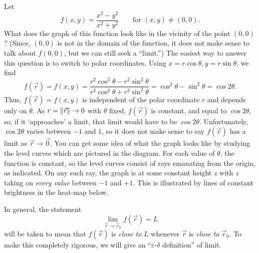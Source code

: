 \begin{example}
	\label{EXDISCONT}
	Let
	\[
	   f(x,y) = \frac{x^2 - y^2}{x^2 + y^2}\qquad\text{for } (x,y) \not= (0,0).
	\]
	 What does the graph of this function look like in the vicinity
	of the point $(0,0)$?   (Since, $(0,0)$ is not in the domain of
	the function, it does not make sense  to talk about
	$f(0,0)$, but we can still seek a ``limit.'')  The easiest way to
	answer this question is to switch to polar coordinates.   Using
	$x = r\cos\theta, y = r\sin\theta$, we find
	\[
	f(\vec r) = f(x,y) = \frac{r^2\cos^2\theta - r^2\sin^2\theta}
	{r^2\cos^2\theta + r^2\sin^2\theta} = \cos^2\theta - \sin^2\theta
	 = \cos 2\theta.
	\]
	Thus, $f(\vec r) = f(x,y)$
	is independent of the polar coordinate $r$ and depends only
	on $\theta$.  As $r = \lVert\vec r\rVert \to 0$ with $\theta$ fixed, $f(\vec r)$
	is constant, and equal to $\cos 2\theta$, so, if  it `approaches'
	a limit, that limit would have to be $\cos 2\theta$.  
	Unfortunately, $\cos 2\theta$ varies between $-1$ and $1$, so it
	does not make sense to say $f(\vec r)$ has a limit as $\vec r \to \vec 0$.
	You can get some idea of what the graph looks like by studying the
	level curves which are pictured in the diagram.  For each value
	of $\theta$, the function is constant, so the level curves consist
	of rays emanating from the origin, as indicated.  On any such
	ray, the graph is at some constant height $z$ with $z$ taking on
	\emph{every value} between $-1$ and $+1$.  This is illustrated by
	lines of constant brightness in the heat-map below.

	\begin{center}
	\end{center}
\end{example}

In general, the statement
\[
  \lim_{\vec r \to \vec r_0} f(\vec r) = L
\]
will be taken to mean that $f(\vec r)$ is \emph{close to} $L$ whenever
$\vec r$ is \emph{close to } $\vec r_0$.   To make this completely
rigorous, we will give an ``$\varepsilon$-$\delta$ definition'' of limit.
 
